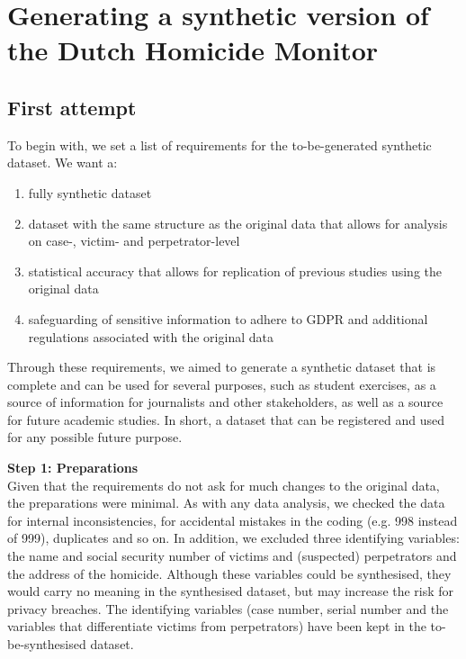 \section{Generating a synthetic version of the Dutch Homicide Monitor}

\subsection{First attempt}

To begin with, we set a list of requirements for the to-be-generated synthetic dataset. We want a: 

\begin{enumerate}[label=\alph*)]
	\item fully synthetic dataset
	\item dataset with the same structure as the original data that allows for analysis on case-, victim- and perpetrator-level
	\item statistical accuracy that allows for replication of previous studies using the original data
	\item safeguarding of sensitive information to adhere to GDPR and additional regulations associated with the original data
\end{enumerate}

Through these requirements, we aimed to generate a synthetic dataset that is complete and can be used for several purposes, such as student exercises, as a source of information for journalists and other stakeholders, as well as a source for future academic studies. In short, a dataset that can be registered and used for any possible future purpose.

\textbf{Step 1: Preparations} \\
Given that the requirements do not ask for much changes to the original data, the preparations were minimal. As with any data analysis, we checked the data for internal inconsistencies, for accidental mistakes in the coding (e.g. 998 instead of 999), duplicates and so on. In addition, we excluded three identifying variables: the name and social security number of victims and (suspected) perpetrators and the address of the homicide. Although these variables could be synthesised, they would carry no meaning in the synthesised dataset, but may increase the risk for privacy breaches. The identifying variables (case number, serial number and the variables that differentiate victims from perpetrators) have been kept in the to-be-synthesised dataset.

